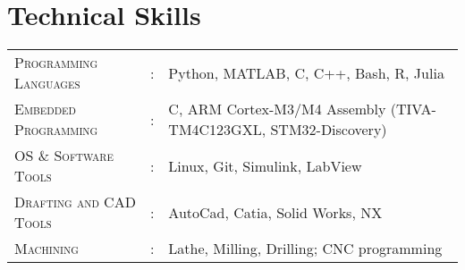 \documentclass[letterpaper,10pt]{article}
\begin{document}
\section{Technical Skills}
\begin{tabular}{l c l}
	\textsc{Programming Languages}&:& Python, MATLAB, C, C++, Bash, R, Julia\\
    \textsc{Embedded Programming}&:& C, ARM Cortex-M3/M4 Assembly (TIVA-TM4C123GXL, STM32-Discovery)\\
	\textsc{OS \& Software Tools}&:& Linux, Git, Simulink, LabView\\
    \textsc{Drafting and CAD Tools}&:& AutoCad, Catia, Solid Works, NX\\
	\textsc{Machining}&:& Lathe, Milling, Drilling; CNC programming\\
\end{tabular}
\end{document}
